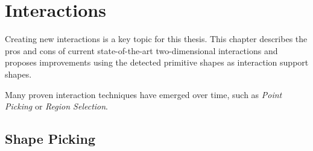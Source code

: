 \chapter{Interactions}

Creating new interactions is a key topic for this thesis. This chapter describes the pros and cons of current state-of-the-art two-dimensional interactions and proposes improvements using the detected primitive shapes as interaction support shapes. 

Many proven interaction techniques have emerged over time, such as \textit{Point Picking} or \textit{Region Selection}. 


\section{Shape Picking}


